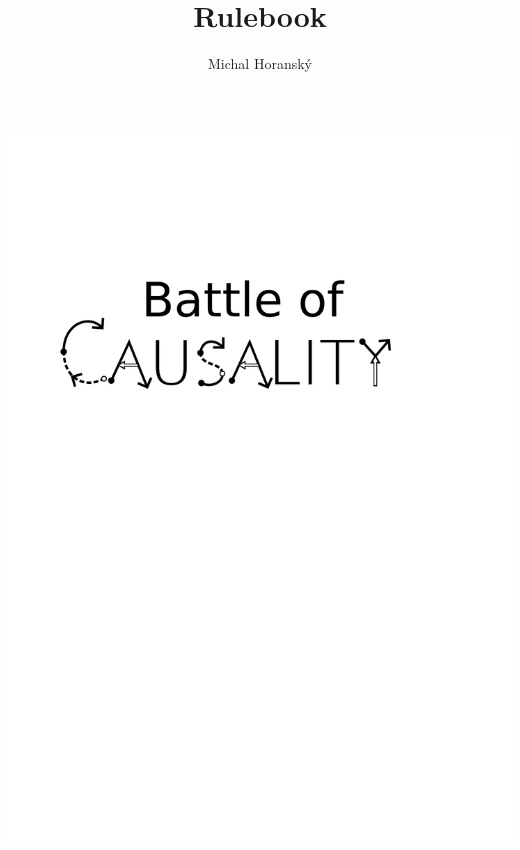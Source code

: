 \documentclass[12pt]{article}
\begin{document}
	
	\title{\hfill\\\hfill\\\Huge Rulebook}
	\author{Michal Horanský}
	\maketitle
	
	\begin{center}
	\vspace*{-10.5cm}\hspace*{1.1cm}\includegraphics[scale=0.5]{images/BoC_logo}\vspace*{-4.5cm}
	\end{center}
	
	\tableofcontents
	
\end{document}
